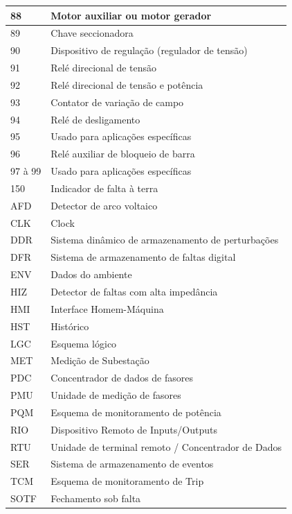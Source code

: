 \documentclass[a5paper]{ufsc-thesis}
\begin{document}
\begin{longtable}{|l|l|}
  88 & Motor auxiliar ou motor gerador \\ \hline
  89 & Chave seccionadora \\ \hline
  90 & Dispositivo de regulação (regulador de tensão) \\ \hline
  91 & Relé direcional de tensão \\ \hline
  92 & Relé direcional de tensão e potência \\ \hline
  93 & Contator de variação de campo \\ \hline
  94 & Relé de desligamento \\ \hline
  95 & Usado para aplicações específicas  \\ \hline
  96 & Relé auxiliar de bloqueio de barra  \\ \hline
  97 à 99 & Usado para aplicações específicas  \\ \hline
  150 & Indicador de falta à terra  \\ \hline
  AFD & Detector de arco voltaico  \\ \hline
  CLK & Clock  \\ \hline
  DDR & Sistema dinâmico de armazenamento de perturbações  \\ \hline
  DFR & Sistema de armazenamento de faltas digital  \\ \hline
  ENV & Dados do ambiente  \\ \hline
  HIZ & Detector de faltas com alta impedância  \\ \hline
  HMI & Interface Homem-Máquina  \\ \hline
  HST & Histórico  \\ \hline
  LGC & Esquema lógico  \\ \hline
  MET & Medição de Subestação  \\ \hline
  PDC & Concentrador de dados de fasores  \\ \hline
  PMU & Unidade de medição de fasores  \\ \hline
  PQM & Esquema de monitoramento de potência  \\ \hline
  RIO & Dispositivo Remoto de Inputs/Outputs  \\ \hline
  RTU & Unidade de terminal remoto / Concentrador de Dados  \\ \hline
  SER & Sistema de armazenamento de eventos  \\ \hline
  TCM & Esquema de monitoramento de Trip  \\ \hline
  SOTF & Fechamento sob falta  \\ \hline
\end{longtable}
\end{document}
